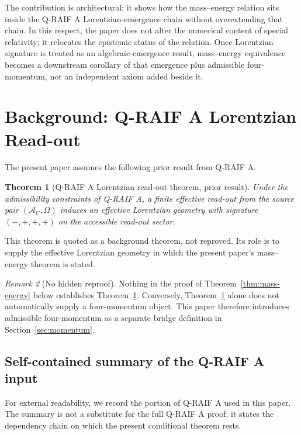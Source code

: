 \documentclass[12pt,a4paper]{article}
\newtheorem{theorem}{Theorem}[section]
\theoremstyle{definition}
\theoremstyle{remark}
\newtheorem{remark}[theorem]{Remark}
\newcommand{\AU}{\mathcal{A}_U}
\newcommand{\Omegastate}{\Omega}
\begin{document}
The contribution is architectural: it shows how the mass--energy relation sits inside the Q-RAIF A Lorentzian-emergence chain without overextending that chain. In this respect, the paper does not alter the numerical content of special relativity; it relocates the epistemic status of the relation. Once Lorentzian signature is treated as an algebraic-emergence result, mass--energy equivalence becomes a downstream corollary of that emergence plus admissible four-momentum, not an independent axiom added beside it.

\section{Background: Q-RAIF A Lorentzian Read-out}
\label{sec:qraif-background}

The present paper assumes the following prior result from Q-RAIF A.

\begin{theorem}[Q-RAIF A Lorentzian read-out theorem, prior result]
\label{thm:qraif-prior}
Under the admissibility constraints of Q-RAIF A, a finite effective read-out from the source pair $(\AU,\Omegastate)$ induces an effective Lorentzian geometry with signature $(-,+,+,+)$ on the accessible read-out sector.
\end{theorem}

This theorem is quoted as a background theorem, not reproved. Its role is to supply the effective Lorentzian geometry in which the present paper's mass--energy theorem is stated.

\begin{remark}[No hidden reproof]
Nothing in the proof of Theorem~\ref{thm:mass-energy} below establishes Theorem~\ref{thm:qraif-prior}. Conversely, Theorem~\ref{thm:qraif-prior} alone does not automatically supply a four-momentum object. This paper therefore introduces admissible four-momentum as a separate bridge definition in Section~\ref{sec:momentum}.
\end{remark}

\subsection{Self-contained summary of the Q-RAIF A input}
\label{sec:qraif-summary}

For external readability, we record the portion of Q-RAIF A used in this paper. The summary is not a substitute for the full Q-RAIF A proof; it states the dependency chain on which the present conditional theorem rests.
\end{document}
